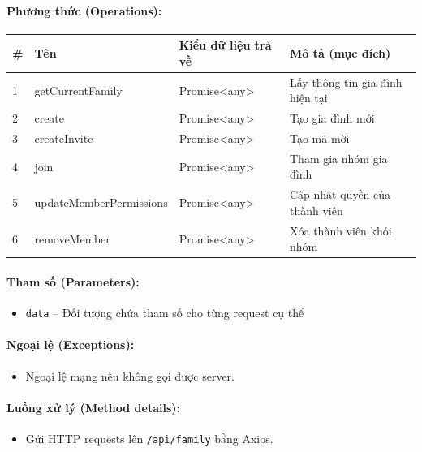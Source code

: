 \documentclass[12pt,a4paper]{article}
\begin{document}
\paragraph{Phương thức (Operations):}
\begin{longtable}{|p{0.6cm}|p{3.8cm}|p{2.6cm}|p{6.5cm}|}
\hline
\textbf{\#} & \textbf{Tên} & \textbf{Kiểu dữ liệu trả về} & \textbf{Mô tả (mục đích)} \\ \hline
\endhead
1 & getCurrentFamily & Promise\textless{}any\textgreater{} & Lấy thông tin gia đình hiện tại \\ \hline
2 & create & Promise\textless{}any\textgreater{} & Tạo gia đình mới \\ \hline
3 & createInvite & Promise\textless{}any\textgreater{} & Tạo mã mời \\ \hline
4 & join & Promise\textless{}any\textgreater{} & Tham gia nhóm gia đình \\ \hline
5 & updateMemberPermissions & Promise\textless{}any\textgreater{} & Cập nhật quyền của thành viên \\ \hline
6 & removeMember & Promise\textless{}any\textgreater{} & Xóa thành viên khỏi nhóm \\ \hline
\end{longtable}

\paragraph{Tham số (Parameters):}
\begin{itemize}[leftmargin=*]
    \item \texttt{data} – Đối tượng chứa tham số cho từng request cụ thể
\end{itemize}


\paragraph{Ngoại lệ (Exceptions):}
\begin{itemize}[leftmargin=*]
    \item Ngoại lệ mạng nếu không gọi được server.
\end{itemize}


\paragraph{Luồng xử lý (Method details):}
\begin{itemize}[leftmargin=*]
    \item Gửi HTTP requests lên \texttt{/api/family} bằng Axios.
\end{itemize}
\end{document}
